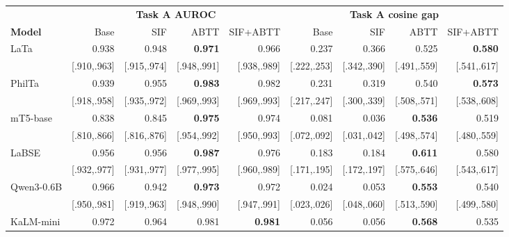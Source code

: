\begin{table}[t]
\centering
\footnotesize
\setlength{\tabcolsep}{1.8pt}
\begin{tabular}{lrrrrrrrr}
\toprule
& \multicolumn{4}{c}{\textbf{Task A AUROC}} & \multicolumn{4}{c}{\textbf{Task A cosine gap}} \\
\cmidrule(lr){2-5}\cmidrule(lr){6-9}
\textbf{Model} & Base & SIF & ABTT & SIF+ABTT & Base & SIF & ABTT & SIF+ABTT \\
\midrule
LaTa & 0.938 & 0.948 & \textbf{0.971} & 0.966 & 0.237 & 0.366 & 0.525 & \textbf{0.580} \\
 & {\scriptsize [.910,.963]} & {\scriptsize [.915,.974]} & {\scriptsize [.948,.991]} & {\scriptsize [.938,.989]} & {\scriptsize [.222,.253]} & {\scriptsize [.342,.390]} & {\scriptsize [.491,.559]} & {\scriptsize [.541,.617]} \\
PhilTa & 0.939 & 0.955 & \textbf{0.983} & 0.982 & 0.231 & 0.319 & 0.540 & \textbf{0.573} \\
 & {\scriptsize [.918,.958]} & {\scriptsize [.935,.972]} & {\scriptsize [.969,.993]} & {\scriptsize [.969,.993]} & {\scriptsize [.217,.247]} & {\scriptsize [.300,.339]} & {\scriptsize [.508,.571]} & {\scriptsize [.538,.608]} \\
mT5-base & 0.838 & 0.845 & \textbf{0.975} & 0.974 & 0.081 & 0.036 & \textbf{0.536} & 0.519 \\
 & {\scriptsize [.810,.866]} & {\scriptsize [.816,.876]} & {\scriptsize [.954,.992]} & {\scriptsize [.950,.993]} & {\scriptsize [.072,.092]} & {\scriptsize [.031,.042]} & {\scriptsize [.498,.574]} & {\scriptsize [.480,.559]} \\
LaBSE & 0.956 & 0.956 & \textbf{0.987} & 0.976 & 0.183 & 0.184 & \textbf{0.611} & 0.580 \\
 & {\scriptsize [.932,.977]} & {\scriptsize [.931,.977]} & {\scriptsize [.977,.995]} & {\scriptsize [.960,.989]} & {\scriptsize [.171,.195]} & {\scriptsize [.172,.197]} & {\scriptsize [.575,.646]} & {\scriptsize [.543,.617]} \\
Qwen3-0.6B & 0.966 & 0.942 & \textbf{0.973} & 0.972 & 0.024 & 0.053 & \textbf{0.553} & 0.540 \\
 & {\scriptsize [.950,.981]} & {\scriptsize [.919,.963]} & {\scriptsize [.948,.990]} & {\scriptsize [.947,.991]} & {\scriptsize [.023,.026]} & {\scriptsize [.048,.060]} & {\scriptsize [.513,.590]} & {\scriptsize [.499,.580]} \\
KaLM-mini & 0.972 & 0.964 & 0.981 & \textbf{0.981} & 0.056 & 0.056 & \textbf{0.568} & 0.535 \\

\end{tabular}
\end{table}
